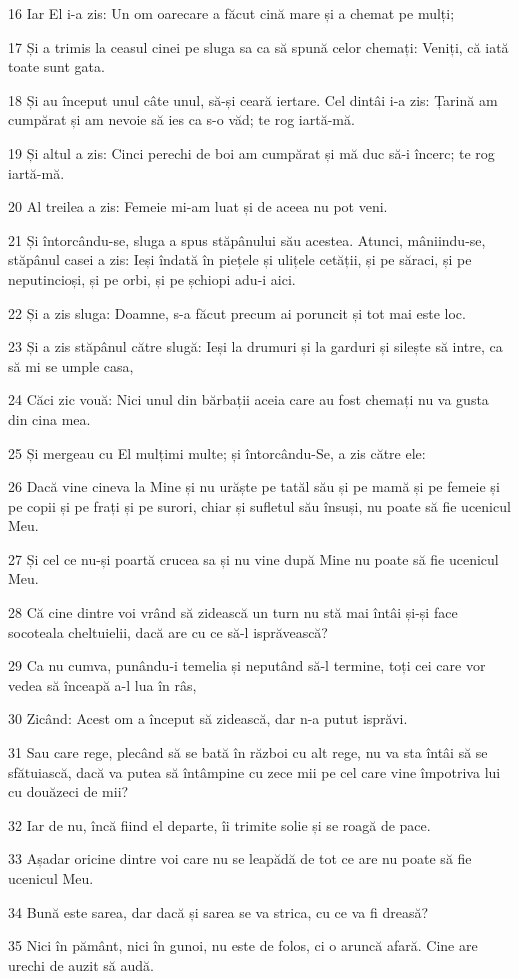 \par 16 Iar El i-a zis: Un om oarecare a făcut cină mare și a chemat pe mulți;
\par 17 Și a trimis la ceasul cinei pe sluga sa ca să spună celor chemați: Veniți, că iată toate sunt gata.
\par 18 Și au început unul câte unul, să-și ceară iertare. Cel dintâi i-a zis: Țarină am cumpărat și am nevoie să ies ca s-o văd; te rog iartă-mă.
\par 19 Și altul a zis: Cinci perechi de boi am cumpărat și mă duc să-i încerc; te rog iartă-mă.
\par 20 Al treilea a zis: Femeie mi-am luat și de aceea nu pot veni.
\par 21 Și întorcându-se, sluga a spus stăpânului său acestea. Atunci, mâniindu-se, stăpânul casei a zis: Ieși îndată în piețele și ulițele cetății, și pe săraci, și pe neputincioși, și pe orbi, și pe șchiopi adu-i aici.
\par 22 Și a zis sluga: Doamne, s-a făcut precum ai poruncit și tot mai este loc.
\par 23 Și a zis stăpânul către slugă: Ieși la drumuri și la garduri și silește să intre, ca să mi se umple casa,
\par 24 Căci zic vouă: Nici unul din bărbații aceia care au fost chemați nu va gusta din cina mea.
\par 25 Și mergeau cu El mulțimi multe; și întorcându-Se, a zis către ele:
\par 26 Dacă vine cineva la Mine și nu urăște pe tatăl său și pe mamă și pe femeie și pe copii și pe frați și pe surori, chiar și sufletul său însuși, nu poate să fie ucenicul Meu.
\par 27 Și cel ce nu-și poartă crucea sa și nu vine după Mine nu poate să fie ucenicul Meu.
\par 28 Că cine dintre voi vrând să zidească un turn nu stă mai întâi și-și face socoteala cheltuielii, dacă are cu ce să-l isprăvească?
\par 29 Ca nu cumva, punându-i temelia și neputând să-l termine, toți cei care vor vedea să înceapă a-l lua în râs,
\par 30 Zicând: Acest om a început să zidească, dar n-a putut isprăvi.
\par 31 Sau care rege, plecând să se bată în război cu alt rege, nu va sta întâi să se sfătuiască, dacă va putea să întâmpine cu zece mii pe cel care vine împotriva lui cu douăzeci de mii?
\par 32 Iar de nu, încă fiind el departe, îi trimite solie și se roagă de pace.
\par 33 Așadar oricine dintre voi care nu se leapădă de tot ce are nu poate să fie ucenicul Meu.
\par 34 Bună este sarea, dar dacă și sarea se va strica, cu ce va fi dreasă?
\par 35 Nici în pământ, nici în gunoi, nu este de folos, ci o aruncă afară. Cine are urechi de auzit să audă.

